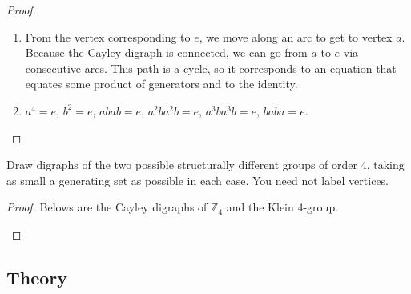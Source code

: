 \begin{proof}
    \begin{enumerate}[label={\textbf{\alph*.}}]
        \item From the vertex corresponding to $e$, we move along an arc to get to vertex $a$. Because the Cayley digraph is connected, we can go from $a$ to $e$ via consecutive arcs. This path is a cycle, so it corresponds to an equation that equates some product of generators and to the identity.
        \item $a^{4} = e$, $b^{2} = e$, $abab = e$, $a^{2}ba^{2}b = e$, $a^{3}ba^{3}b = e$, $baba = e$.
    \end{enumerate}
\end{proof}

\begin{exercise}
    Draw digraphs of the two possible structurally different groups of order 4, taking as small a generating set as possible in each case. You need not label vertices.
\end{exercise}

\begin{proof}
    Belows are the Cayley digraphs of $\mathbb{Z}_{4}$ and the Klein 4-group.
    \begin{center}
    \end{center}
\end{proof}

\subsection*{Theory}

